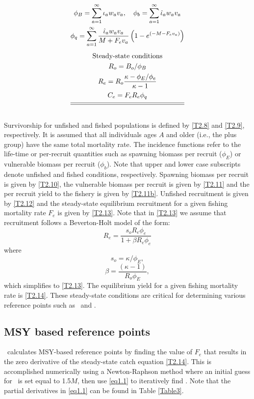 \begin{table}[!tbp]
\begin{gather}
            \phi_B=\sum_{a=1}^\infty \iota_a w_a v_a, \quad
            \phi_b=\sum_{a=1}^\infty \hat{\iota}_a w_a v_a \label{T2.11}\\
            \phi_q=\sum_{a=1}^\infty
                \frac{ \hat{\iota}_a w_a v_a}{M+F_ev_a}
                \left(1-e^{(-M-F_ev_a)}\right) \label{T2.11b} \\[1ex]
        \mbox{Steady-state conditions} \nonumber \\
        R_o=B_o/ \phi_B \label{T2.12}\\
        R_e=R_o\frac{\kappa-\phi_E/\phi_e}{\kappa-1} \label{T2.13}\\
        C_e=F_e R_e \phi_q\label{T2.14} \\[1ex]
        \hline \hline \nonumber
    \end{gather}
    \normalEq
\end{table}
Survivorship for unfished and fished populations is defined by \eqref{T2.8} and \eqref{T2.9}, respectively.  It is assumed that all individuals ages $A$ and older (i.e., the plus group) have the same total mortality rate.  The incidence functions refer to the life-time or per-recruit quantities such as spawning biomass per recruit ($\phi_E$) or vulnerable biomass per recruit ($\phi_b$).  Note that upper and lower case subscripts denote unfished and fished conditions, respectively.  Spawning biomass per recruit is given by \eqref{T2.10}, the vulnerable biomass per recruit is given by \eqref{T2.11} and the per recruit yield to the fishery is given by \eqref{T2.11b}.  Unfished recruitment is given by \eqref{T2.12} and the steady-state equilibrium recruitment  for a given fishing mortality rate $F_e$ is given by \eqref{T2.13}.  Note that in \eqref{T2.13} we assume that recruitment follows a Beverton-Holt model of the form:
\[
R_e=\frac{s_o R_e \phi_e}{1+\beta R_e \phi_e}
\]
where
\[
s_o = \kappa/\phi_E,
\]
\[
\beta = \frac{(\kappa-1)}{R_o\phi_E},
\]
which simplifies to \eqref{T2.13}.
The equilibrium yield for a given fishing mortality rate is \eqref{T2.14}.  These steady-state conditions are critical for determining various reference points such as \fmsy\ and \bmsy. 
	
\subsection{MSY based reference points}
\iscam\ calculates MSY-based reference points by finding the value of $F_e$ that results in the zero derivative of the steady-state catch equation \eqref{T2.14}.  This is accomplished numerically using a Newton-Raphson method where an initial guess for \fmsy\ is set equal to 1.5$M$, then use \eqref{eq1.1} to iteratively find \fmsy.  Note that the partial derivatives in \eqref{eq1.1} can be found in Table \ref{Table3}.

